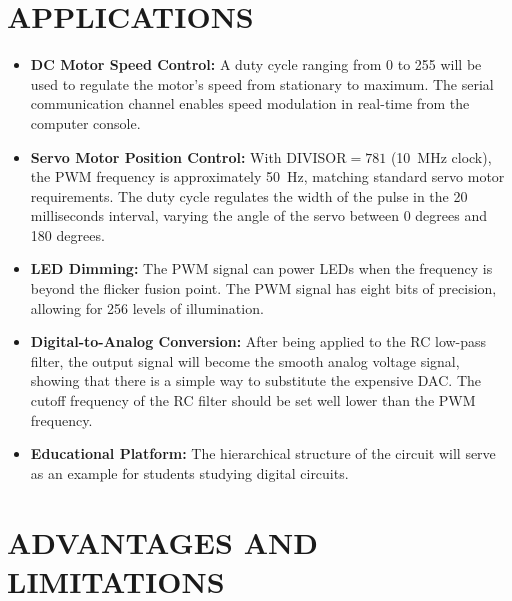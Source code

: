 \documentclass[12pt,a4paper]{article}
\begin{document}
\section{APPLICATIONS}

\begin{itemize}
\item \textbf{DC Motor Speed Control:} A duty cycle ranging from 0 to 255 will be used to regulate the motor's speed from stationary to maximum. The serial communication channel enables speed modulation in real-time from the computer console.

\item \textbf{Servo Motor Position Control:} With DIVISOR${}=781$ (10~MHz clock), the PWM frequency is approximately 50~Hz, matching standard servo motor requirements. The duty cycle regulates the width of the pulse in the 20 milliseconds interval, varying the angle of the servo between 0 degrees and 180 degrees.

\item \textbf{LED Dimming:} The PWM signal can power LEDs when the frequency is beyond the flicker fusion point. The PWM signal has eight bits of precision, allowing for 256 levels of illumination.

\item \textbf{Digital-to-Analog Conversion:} After being applied to the RC low-pass filter, the output signal will become the smooth analog voltage signal, showing that there is a simple way to substitute the expensive DAC. The cutoff frequency of the RC filter should be set well lower than the PWM frequency.

\item \textbf{Educational Platform:} The hierarchical structure of the circuit will serve as an example for students studying digital circuits.
\end{itemize}

\section{ADVANTAGES AND LIMITATIONS}
\end{document}
